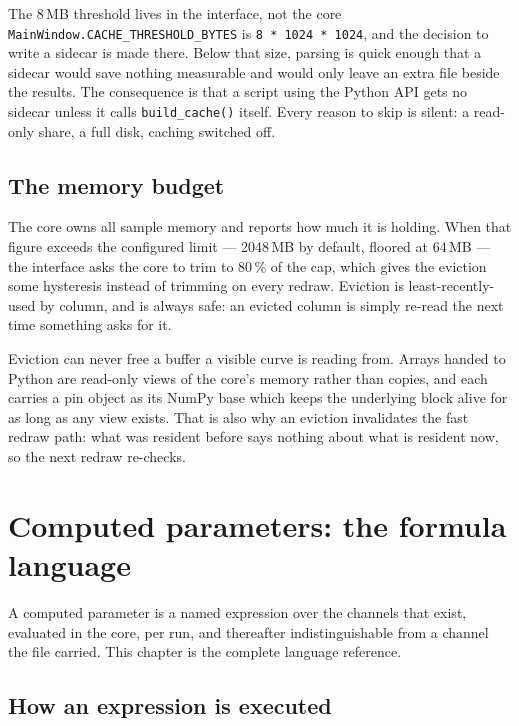 \documentclass[11pt,a4paper,oneside]{report}
\newcommand{\code}[1]{\texttt{#1}}
\begin{document}
\begin{aoenote}{The 8\,MB threshold lives in the interface, not the core}
\code{MainWindow.CACHE\_THRESHOLD\_BYTES} is \code{8 * 1024 * 1024}, and the
decision to write a sidecar is made there. Below that size, parsing is quick
enough that a sidecar would save nothing measurable and would only leave an extra
file beside the results. The consequence is that a script using the Python API
gets no sidecar unless it calls \code{build\_cache()} itself. Every reason to
skip is silent: a read-only share, a full disk, caching switched off.
\end{aoenote}

\section{The memory budget}

The core owns all sample memory and reports how much it is holding. When that
figure exceeds the configured limit --- 2048\,MB by default, floored at 64\,MB
--- the interface asks the core to trim to 80\,\% of the cap, which gives the
eviction some hysteresis instead of trimming on every redraw. Eviction is
least-recently-used by column, and is always safe: an evicted column is simply
re-read the next time something asks for it.

Eviction can never free a buffer a visible curve is reading from. Arrays handed
to Python are read-only views of the core's memory rather than copies, and each
carries a pin object as its NumPy base which keeps the underlying block alive for
as long as any view exists. That is also why an eviction invalidates the fast
redraw path: what was resident before says nothing about what is resident now, so
the next redraw re-checks.

\chapter{Computed parameters: the formula language}
\label{ch:formula}

A computed parameter is a named expression over the channels that exist,
evaluated in the core, per run, and thereafter indistinguishable from a channel
the file carried. This chapter is the complete language reference.

\section{How an expression is executed}
\end{document}
